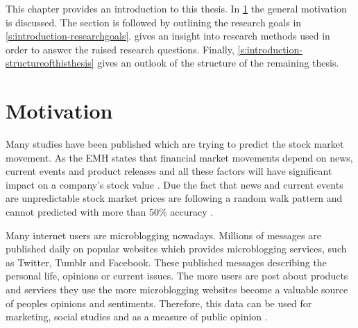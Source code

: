 



This chapter provides an introduction to this thesis.
In \cref{s:introduction-motivation} the general motivation is discussed.
The section is followed by outlining the research goals in \cref{s:introduction-researchgoals}.
 gives an insight into research methods used in order to answer the raised research questions.
Finally, \cref{s:introduction-structureofthisthesis} gives an outlook of the structure of the remaining thesis.

\section{Motivation}
\label{s:introduction-motivation}

Many studies have been published which are trying to predict the stock market movement.
As the \ac{EMH} states that financial market movements depend on news, current events and product releases and all these factors will have significant impact on a company's stock value
\citep{fama1965behavior}.
Due the fact that news and current events are unpredictable stock market prices are following a random walk pattern and cannot predicted with more than 50\% accuracy
\citep{Pagolu2016a}.

Many internet users are microblogging nowadays.
Millions of messages are published daily on popular websites which provides microblogging services, such as Twitter, Tumblr and Facebook.
These published messages describing the personal life, opinions or current issues.
The more users are post about products and services they use the more microblogging websites become a valuable source of peoples opinions and sentiments.
Therefore, this data can be used for marketing, social studies and as a measure of public opinion
\citep{Patodkar2016a, Pagolu2016a}.


